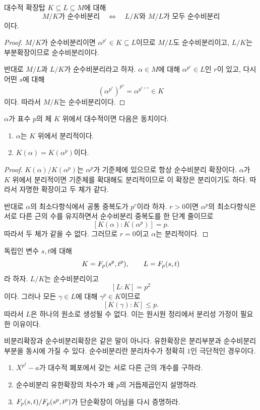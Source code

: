 \begin{corollary}
대수적 확장탑 $K\subseteq L\subseteq M$에 대해
\[
  M/K\text{가 순수비분리}
  \quad\Longleftrightarrow\quad
  L/K\text{와 }M/L\text{가 모두 순수비분리}
\]
이다.
\end{corollary}

\begin{proof}
$M/K$가 순수비분리이면 $\alpha^{p^r}\in K\subseteq L$이므로 $M/L$도 순수비분리이고, $L/K$는 부분확장이므로 순수비분리이다.

반대로 $M/L$과 $L/K$가 순수비분리라고 하자. $\alpha\in M$에 대해 $\alpha^{p^r}\in L$인 $r$이 있고, 다시 어떤 $s$에 대해
\[
  (\alpha^{p^r})^{p^s}=\alpha^{p^{r+s}}\in K
\]
이다. 따라서 $M/K$는 순수비분리이다.
\end{proof}

\begin{proposition}
$\alpha$가 표수 $p$의 체 $K$ 위에서 대수적이면 다음은 동치이다.
\begin{enumerate}[label=(\roman*)]
  \item $\alpha$는 $K$ 위에서 분리적이다.
  \item $K(\alpha)=K(\alpha^p)$이다.
\end{enumerate}
\end{proposition}

\begin{proof}
$K(\alpha)/K(\alpha^p)$는 $\alpha^p$가 기준체에 있으므로 항상 순수비분리 확장이다. $\alpha$가 $K$ 위에서 분리적이면 기준체를 확대해도 분리적이므로 이 확장은 분리이기도 하다. 따라서 자명한 확장이고 두 체가 같다.

반대로 $\alpha$의 최소다항식에서 공통 중복도가 $p^r$이라 하자. $r>0$이면 $\alpha^p$의 최소다항식은 서로 다른 근의 수를 유지하면서 순수비분리 중복도를 한 단계 줄이므로
\[
  [K(\alpha):K(\alpha^p)]=p.
\]
따라서 두 체가 같을 수 없다. 그러므로 $r=0$이고 $\alpha$는 분리적이다.
\end{proof}

\begin{example}
독립인 변수 $s,t$에 대해
\[
  K=F_p(s^p,t^p),
  \qquad
  L=F_p(s,t)
\]
라 하자. $L/K$는 순수비분리이고
\[
  [L:K]=p^2
\]
이다. 그러나 모든 $\gamma\in L$에 대해 $\gamma^p\in K$이므로
\[
  [K(\gamma):K]\le p.
\]
따라서 $L$은 하나의 원소로 생성될 수 없다. 이는 원시원 정리에서 분리성 가정이 필요한 이유이다.
\end{example}

\begin{pitfall}
비분리확장과 순수비분리확장은 같은 말이 아니다. 유한확장은 분리부분과 순수비분리부분을 동시에 가질 수 있다. 순수비분리란 분리차수가 정확히 $1$인 극단적인 경우이다.
\end{pitfall}

\begin{checkpoint}
\begin{enumerate}[label=(\alph*)]
  \item $X^{p^2}-a$가 대수적 폐포에서 갖는 서로 다른 근의 개수를 구하라.
  \item 순수비분리 유한확장의 차수가 왜 $p$의 거듭제곱인지 설명하라.
  \item $F_p(s,t)/F_p(s^p,t^p)$가 단순확장이 아님을 다시 증명하라.
\end{enumerate}
\end{checkpoint}
